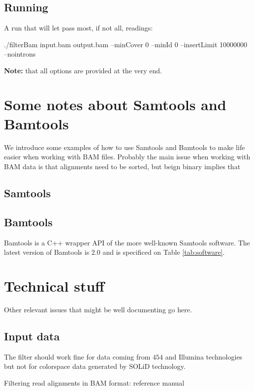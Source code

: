\documentclass[11pt]{article}
\begin{document}
{\subsection{Running}
A run that will let pass most, if not all, readings: 
\begin{flushleft}
./filterBam input.bam output.bam --minCover 0 --minId 0  --insertLimit 10000000 --nointrons
\end{flushleft}
\textbf{Note:} that all options are provided at the very end.


\section{Some notes about Samtools and Bamtools}

We introduce some examples of how to use Samtools and Bamtools to make life easier when working with BAM files. 
Probably the main issue when working with BAM data is that alignments need to be sorted, but beign binary 
implies that  
 
\subsection{Samtools}

\subsection{Bamtools}
Bamtools is a C++ wrapper API of the more well-known Samtools software. The latest version of Bamtools 
is 2.0 and is specificed on Table \ref{tab:software}. 


\section{Technical stuff}

Other relevant issues that might be well documenting go here.

\subsection{Input data}
The filter should work fine for data coming from $454$ and Illumina technologies but not for colorspace data generated by SOLiD technology. 


\newpage
\begin{center}
{\LARGE Filtering read alignments in BAM format: reference manual}
\end{center}

}
\end{document}
